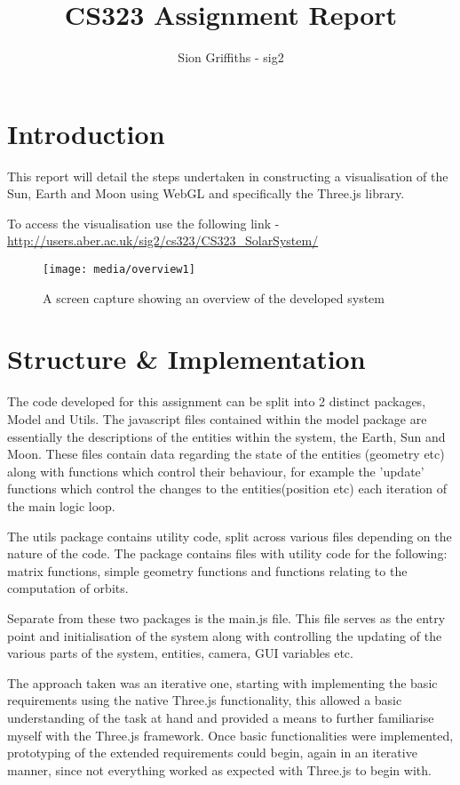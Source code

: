 \documentclass[titlepage]{article}
\title{CS323 Assignment Report}
\author{Sion Griffiths - sig2}
\begin{document}
\maketitle
\tableofcontents




\newpage
\section{Introduction}

This report will detail the steps undertaken in constructing a visualisation of the Sun, Earth and Moon using WebGL and specifically the Three.js library.

To access the visualisation use the following link -  \url{http://users.aber.ac.uk/sig2/cs323/CS323\_SolarSystem/}


\begin{figure}[h!]
                \centering
                \texttt{[image: media/overview1]}
                \caption{A screen capture showing an overview of the developed system}
                \label{fig:basic_model}
            \end{figure}


\section{Structure \& Implementation}
The code developed for this assignment can be split into 2 distinct packages, Model and Utils. The javascript files contained within the model package are essentially the descriptions of the entities within the system, the Earth, Sun and Moon. These files contain data regarding the state of the entities (geometry etc) along with functions which control their behaviour, for example the 'update' functions which control the changes to the entities(position etc) each iteration of the main logic loop.


The utils package contains utility code, split across various files depending on the nature of the code. The package contains files with utility code for the following: matrix functions, simple geometry functions and functions relating to the computation of orbits.


Separate from these two packages is the main.js file. This file serves as the entry point and initialisation of the system along with controlling the updating of the various parts of the system, entities, camera, GUI variables etc. 


The approach taken was an iterative one, starting with implementing the basic requirements using the native Three.js functionality, this allowed a basic understanding of the task at hand and provided a means to further familiarise myself with the Three.js framework. Once basic functionalities were implemented, prototyping of the extended requirements could begin, again in an iterative manner, since not everything worked as expected with Three.js to begin with.
\end{document}
